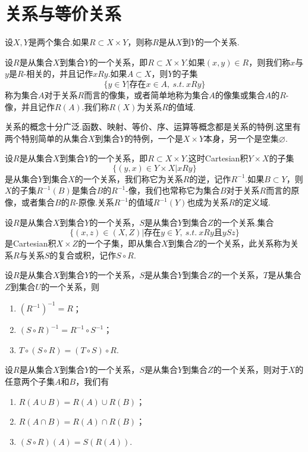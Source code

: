 \section{关系与等价关系}
\begin{definition}[关系]
	设$X,Y$是两个集合.如果$R\subset X\times Y$，则称$R$是从$X$到$Y$的一个{\heiti 关系}.
\end{definition}
\begin{definition}[值域]
	设$R$是从集合$X$到集合$Y$的一个关系，即$R\subset X\times Y$.如果$(x,y)\in R$，则我们称$x$与$y$是{\heiti $R$-相关的}，并且记作$xRy$.如果$A\subset X$，则$Y$的子集
	$$\{y\in Y|\text{存在}x\in A,\ s.t.\ xRy\}$$
	称为{\heiti 集合$A$对于关系$R$而言的像集}，或者简单地称为集合$A$的{\heiti 像集}或集合$A$的{\heiti $R$-像}，并且记作$R(A)$.我们称$R(X)$为关系$R$的{\heiti 值域}.
\end{definition}
关系的概念十分广泛.函数、映射、等价、序、运算等概念都是关系的特例.这里有两个特别简单的从集合$X$到集合$Y$的特例，一个是$X\times Y$本身，另一个是空集$\varnothing$.
\begin{definition}[定义域]
	设$R$是从集合$X$到集合$Y$的一个关系，即$R\subset X\times Y$.这时Cartesian积$Y\times X$的子集
	$$\{(y,x)\in Y\times X|xRy\}$$
	是从集合$Y$到集合$X$的一个关系，我们称它为关系$R$的{\heiti 逆}，记作$R^{-1}$.如果$B\subset Y$，则$X$的子集$R^{-1}(B)$是集合$B$的{\heiti $R^{-1}$-像}，我们也常称它为集合$B$对于关系$R$而言的{\heiti 原像}，或者集合$B$的{\heiti $R$-原像}.关系$R^{-1}$的值域$R^{-1}(Y)$也成为关系$R$的{\heiti 定义域}.
\end{definition}
\begin{definition}[复合关系]
	设$R$是从集合$X$到集合$Y$的一个关系，$S$是从集合$Y$到集合$Z$的一个关系.集合
	$$\{(x,z)\in(X,Z)|\text{存在}y\in Y,\ s.t.\ xRy\text{且}ySz\}$$
	是Cartesian积$X\times Z$的一个子集，即从集合$X$到集合$Z$的一个关系，此关系称为关系$R$与关系$S$的{\heiti 复合}或{\heiti 积}，记作$S\circ R$.
\end{definition}
\begin{theorem}
	设$R$是从集合$X$到集合$Y$的一个关系，$S$是从集合$Y$到集合$Z$的一个关系，$T$是从集合$Z$到集合$U$的一个关系，则
	\begin{enumerate}[(1)]
		\item $(R^{-1})^{-1}=R$；
		\item $(S\circ R)^{-1}=R^{-1}\circ S^{-1}$；
		\item $T\circ(S\circ R)=(T\circ S)\circ R$.
	\end{enumerate}
\end{theorem}
\begin{theorem}
	设$R$是从集合$X$到集合$Y$的一个关系，$S$是从集合$Y$到集合$Z$的一个关系，则对于$X$的任意两个子集$A$和$B$，我们有
	\begin{enumerate}[(1)]
		\item $R(A\cup B)=R(A)\cup R(B)$；
		\item $R(A\cap B)=R(A)\cap R(B)$；
		\item $(S\circ R)(A)=S(R(A))$.
	\end{enumerate}
\end{theorem}
